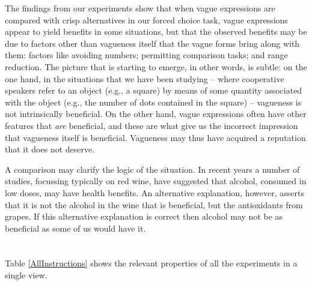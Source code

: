 \documentclass[
a4paper 
, doc
, longtable
]{apa6}
\begin{document}
The findings from our experiments show that when vague expressions are compared with crisp alternatives in our forced choice task, vague expressions appear to yield benefits in some situations, but that the observed benefits may be due to factors other than vagueness itself that the vague forms bring along with them: factors like avoiding numbers; permitting comparison tasks; and range reduction. The picture that is starting to emerge, in other words, is subtle: on the one hand, in the situations that we have been studying -- where cooperative speakers refer to an object (e.g., a square) by means of some quantity associated with the object (e.g., the number of dots contained in the square) -- vagueness is not intrinsically beneficial. On the other hand, vague expressions often have other features that {\em are} beneficial, and these are what give us the incorrect impression that vagueness itself is beneficial. Vagueness may thus have acquired a reputation that it does not deserve. 

A comparison may clarify the logic of the situation. In recent years a number of studies, focussing typically on red wine, have suggested that alcohol, consumed in low doses, may have health benefits. An alternative explanation, however, asserts that it is not the alcohol in the wine that is beneficial, but the antioxidants from grapes. If this alternative explanation is correct then alcohol may not be as beneficial as some of us would have it. %


\printbibliography

\appendix
\section{}

Table \ref{AllInstructions} shows the relevant properties of all the experiments in a single view.


\newcommand\T{\rule{0pt}{2.6ex}}       %
\newcommand\B{\rule[-2.2ex]{0pt}{0pt}} %
\end{document}
